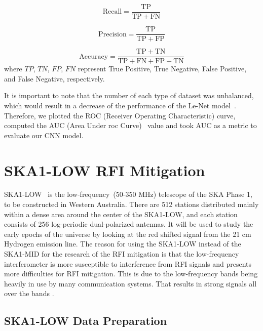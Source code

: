 \documentclass[usenatbib]{mnras}
\begin{document}
\begin{equation}
\mathrm{Recall}=\frac{\mathrm{TP}}{\mathrm{TP}+\mathrm{FN}}
\end{equation}

\begin{equation}
\mathrm{Precision}=\frac{\mathrm{TP}}{\mathrm{TP}+\mathrm{FP}}
\end{equation}

\begin{equation}
\mathrm{Accuracy}=\frac{\mathrm{TP}+\mathrm{TN}}{\mathrm{TP}+\mathrm{FN}+\mathrm{FP}+\mathrm{TN}}
\end{equation}
where $TP$, $TN$, $FP$, $FN$ represent True Positive, True Negative, False Positive, and False Negative, respectively. 

It is important to note that the number of each type of dataset was unbalanced, which would result in a decrease of the performance of the Le-Net model~\citep{bhowan2012evolving}. Therefore, we plotted the ROC (Receiver Operating Characteristic) curve, computed the AUC (Area Under roc Curve)~\citep{bradley1997use} value and took AUC as a metric to evaluate our CNN model. 

\section{SKA1-LOW RFI Mitigation}
\label{3}

SKA1-LOW~\citep{mellema2013reionization} is the low-frequency~(50-350 MHz) telescope of the SKA Phase 1, to be constructed in Western Australia. There are 512 stations distributed mainly within a dense area around the center of the SKA1-LOW, and each station consists of 256 log-periodic dual-polarized antennas. It will be used to study the early epochs of the universe by looking at the red shifted signal from the 21 cm Hydrogen emission line. The reason for using the SKA1-LOW instead of the SKA1-MID for the research of the RFI mitigation is that the low-frequency interferometer is more susceptible to interference from RFI signals and presents more difficulties for RFI mitigation. 
This is due to the low-frequency bands being heavily in use by many communication systems. That results in strong signals all over the bands \citep{baan2011rfi}.

\subsection{SKA1-LOW Data Preparation}
\end{document}
